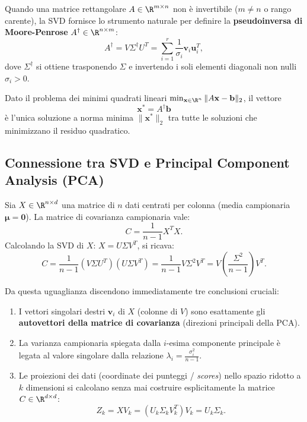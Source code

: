Quando una matrice rettangolare $A \in \R^{m \times n}$ non è invertibile ($m \ne n$ o rango carente), la SVD fornisce lo strumento naturale per definire la \textbf{pseudoinversa di Moore-Penrose} $A^\dagger \in \R^{n \times m}$:
\begin{equation}
    A^\dagger = V \Sigma^\dagger U^T = \sum_{i=1}^r \frac{1}{\sigma_i} \mathbf{v}_i \mathbf{u}_i^T,
\end{equation}
dove $\Sigma^\dagger$ si ottiene trasponendo $\Sigma$ e invertendo i soli elementi diagonali non nulli $\sigma_i > 0$.

\begin{property}
Dato il problema dei minimi quadrati lineari $\min_{\mathbf{x} \in \R^n} \|A \mathbf{x} - \mathbf{b}\|_2$, il vettore
\begin{equation}
    \mathbf{x}^* = A^\dagger \mathbf{b}
\end{equation}
è l'unica soluzione a norma minima $\|\mathbf{x}^*\|_2$ tra tutte le soluzioni che minimizzano il residuo quadratico.
\end{property}

\subsection{Connessione tra SVD e Principal Component Analysis (PCA)}

Sia $X \in \R^{n \times d}$ una matrice di $n$ dati centrati per colonna (media campionaria $\boldsymbol{\mu} = \mathbf{0}$). La matrice di covarianza campionaria vale:
\begin{equation}
    C = \frac{1}{n-1} X^T X.
\end{equation}
Calcolando la SVD di $X$: $X = U \Sigma V^T$, si ricava:
\begin{equation}
    C = \frac{1}{n-1} (V \Sigma U^T) (U \Sigma V^T) = \frac{1}{n-1} V \Sigma^2 V^T = V \left( \frac{\Sigma^2}{n-1} \right) V^T.
\end{equation}

Da questa uguaglianza discendono immediatamente tre conclusioni cruciali:
\begin{enumerate}
    \item I vettori singolari destri $\mathbf{v}_i$ di $X$ (colonne di $V$) sono esattamente gli \textbf{autovettori della matrice di covarianza} (direzioni principali della PCA).
    \item La varianza campionaria spiegata dalla $i$-esima componente principale è legata al valore singolare dalla relazione $\lambda_i = \frac{\sigma_i^2}{n-1}$.
    \item Le proiezioni dei dati (coordinate dei punteggi / \textit{scores}) nello spazio ridotto a $k$ dimensioni si calcolano senza mai costruire esplicitamente la matrice $C \in \R^{d \times d}$:
    \begin{equation}
        Z_k = X V_k = (U_k \Sigma_k V_k^T) V_k = U_k \Sigma_k.
    \end{equation}
\end{enumerate}


